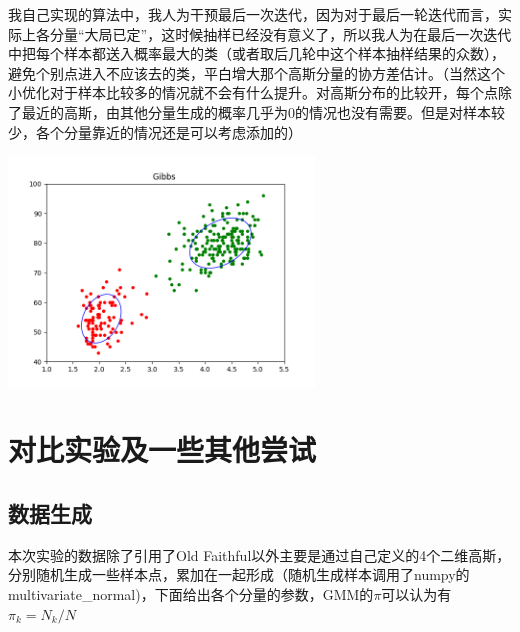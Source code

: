 \documentclass[hyperref,UTF8]{ctexart}
\begin{document}
\par 我自己实现的算法中，我人为干预最后一次迭代，因为对于最后一轮迭代而言，实际上各分量“大局已定”，这时候抽样已经没有意义了，所以我人为在最后一次迭代中把每个样本都送入概率最大的类（或者取后几轮中这个样本抽样结果的众数），避免个别点进入不应该去的类，平白增大那个高斯分量的协方差估计。（当然这个小优化对于样本比较多的情况就不会有什么提升。对高斯分布的比较开，每个点除了最近的高斯，由其他分量生成的概率几乎为0的情况也没有需要。但是对样本较少，各个分量靠近的情况还是可以考虑添加的） 


\centerline{\includegraphics[height=2.4in]{exp-results/Gibbs_OF.png}}



\section*{对比实验及一些其他尝试}
\subsection*{数据生成} 
本次实验的数据除了引用了Old Faithful以外主要是通过自己定义的4个二维高斯，分别随机生成一些样本点，累加在一起形成（随机生成样本调用了numpy的multivariate\_normal)，下面给出各个分量的参数，GMM的$\pi$可以认为有$\pi_k = N_k/N$\\
\begin{table}[!htbp]
  \centering
\caption{生成样本参数}
\label{tb:lda_knn}
\end{table}
\end{document}
